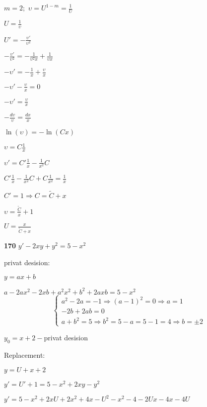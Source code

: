 \documentclass{article}
\begin{document}
\begin{center}
\begin{spacing}{2.2}
$m=2; $ $\displaystyle \upsilon=U^{1-m}=\frac{1}{U}$

$\displaystyle U=\frac{1}{\upsilon}$

$\displaystyle U'=-\frac{\upsilon'}{\upsilon^2}$

$\displaystyle -\frac{\upsilon'}{\upsilon^2}=-\frac{1}{\upsilon^2 x}+\frac{1}{\upsilon x}$

$\displaystyle -\upsilon'=-\frac{1}{x}+\frac{\upsilon}{x}$

$\displaystyle -\upsilon'-\frac{\upsilon}{x}=0$

$\displaystyle -\upsilon'=\frac{\upsilon}{x}$

$\displaystyle -\frac{d\upsilon}{\upsilon}=\frac{dx}{x}$

$\ln(\upsilon)=-\ln(Cx)$

$\displaystyle \upsilon=C\frac{1}{x}$

$\displaystyle \upsilon'=C'\frac{1}{x}-\frac{1}{x^2}C$

$\displaystyle C'\frac{1}{x}-\frac{1}{x^2}C+C\frac{1}{x^2}=\frac{1}{x}$

$C'=1 \Rightarrow C= \widetilde{C}+x$

$\displaystyle \upsilon=\frac{\widetilde{C}}{x}+1$

$\displaystyle U=\frac{x}{\widetilde{C}+x}$

\end{spacing}
\end{center}

\begin{flushleft}
{\bf 170 } $y'-2xy+y^2=5-x^2$


\end{flushleft}
privat desision:
\begin{center}
\begin{spacing}{1.5}
$y=ax+b$

$a-2ax^2-2xb+a^2x^2+b^2+2axb=5-x^2$
\begin{equation*}
 \begin{cases}
   a^2-2a=-1 \Rightarrow (a-1)^2=0 \Rightarrow a=1
   \\
   -2b+2ab=0
   \\
   a+b^2=5 \Rightarrow b^2=5-a=5-1=4 \Rightarrow b=\pm2
 \end{cases}
\end{equation*}

$y_0=x+2 - $privat desision
\end{spacing}
\end{center}
Replacement:
\begin{center} 
\begin{spacing}{1.8}
$y=U+x+2$

$y'=U'+1=5-x^2+2xy-y^2$

$y'=5-x^2+2xU+2x^2+4x-U^2-x^2-4-2Ux-4x-4U$

\end{spacing}
\end{center}
\end{document}
